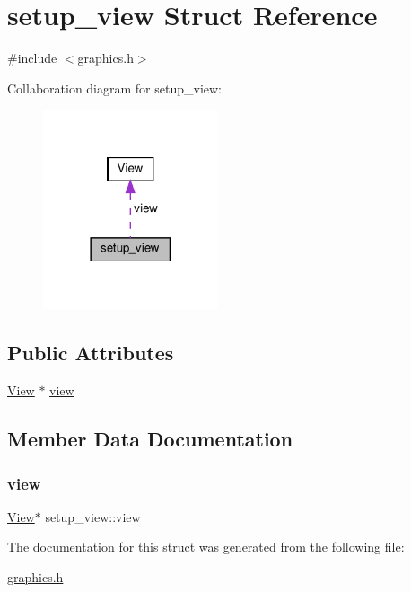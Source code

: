 \hypertarget{structsetup__view}{}\section{setup\+\_\+view Struct Reference}
\label{structsetup__view}


{\ttfamily \#include $<$graphics.\+h$>$}



Collaboration diagram for setup\+\_\+view\+:\nopagebreak
\begin{figure}[H]
\begin{center}
\leavevmode
\includegraphics[width=146pt]{structsetup__view__coll__graph}
\end{center}
\end{figure}
\subsection*{Public Attributes}
\begin{DoxyCompactItemize}
\item 
\hyperlink{structView}{View} $\ast$ \hyperlink{structsetup__view_a480e2ffffe2e3294b565910c2fa55ee7}{view}
\end{DoxyCompactItemize}


\subsection{Member Data Documentation}
\mbox{\label{structsetup__view_a480e2ffffe2e3294b565910c2fa55ee7}} 
\subsubsection{\texorpdfstring{view}{view}}
{\footnotesize\ttfamily \hyperlink{structView}{View}$\ast$ setup\+\_\+view\+::view}



The documentation for this struct was generated from the following file\+:\begin{DoxyCompactItemize}
\item 
\hyperlink{graphics_8h}{graphics.\+h}\end{DoxyCompactItemize}

